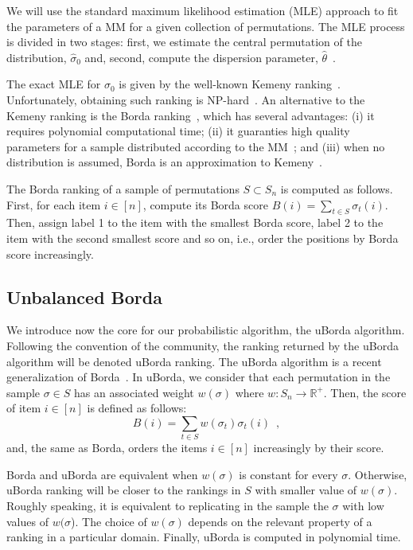 \documentclass[runningheads]{llncs}
\begin{document}
We will use the standard maximum likelihood estimation (MLE) approach to fit the parameters of a MM for a given collection of permutations. 
The MLE process is divided in two stages: first, we estimate the central permutation of the distribution, $\hat{\sigma}_0$ and, second, compute the dispersion parameter, $\hat\theta$~\cite{IruCalLoz2016permallows}. 

The exact MLE for $\sigma_0$ is given by the well-known Kemeny ranking~\cite{DwoKumNao2001rank}. Unfortunately,  obtaining such ranking is NP-hard~\cite{DwoKumNao2001rank}. An alternative to the Kemeny ranking is the Borda ranking~\cite{AliMei2011kemeny}, which has several advantages: (i) it requires polynomial computational time; (ii) it  guaranties  high quality parameters for a sample distributed according to the MM~\cite{CarProSha2013votes}; and (iii) when no distribution is assumed, Borda is an approximation to Kemeny~\cite{CopFleRur2010ordering}.

The Borda ranking of a sample of permutations $S \subset S_n$ is computed as follows. 
First, for each item $i \in [n]$, compute its Borda score $B(i) =  \sum_{t\in S}  \sigma_t(i)$. Then, assign label 1 to the item with the smallest Borda score, label 2 to the item with the second smallest score and so on, i.e., order the positions by Borda score increasingly.

\subsection{Unbalanced Borda}\label{sec:uborda}
We introduce now the core for our probabilistic algorithm, the uBorda algorithm. Following the convention of the community, the ranking returned by the uBorda algorithm will be denoted uBorda ranking. The uBorda algorithm is a recent generalization of Borda~\cite{IruLobPer2020arxiv}. In uBorda, we consider that each permutation in the sample $\sigma\in S$ has an associated weight $w(\sigma)$ where $w\colon S_n \to \mathbb{R^{+}}$. Then, the score of item $i \in [n]$ is defined as follows:
%
\begin{equation}\label{eq:uborda_score}
B(i) =  \sum_{t\in S}  w(\sigma_t) \sigma_t(i) \enspace,
\end{equation}
%
and, the same as Borda, orders the items $i \in [n]$ increasingly by their score.

Borda and uBorda are equivalent when $w(\sigma)$ is constant for every $\sigma$. Otherwise, uBorda ranking will be closer to the rankings in $S$ with smaller value of $w(\sigma)$. Roughly speaking, it is equivalent to replicating in the sample the $\sigma$ with low values of $w(\sigma$).
The choice of  $w(\sigma)$ depends on the relevant property of a ranking in a particular domain.
%
Finally, uBorda is computed in polynomial time.
\end{document}
